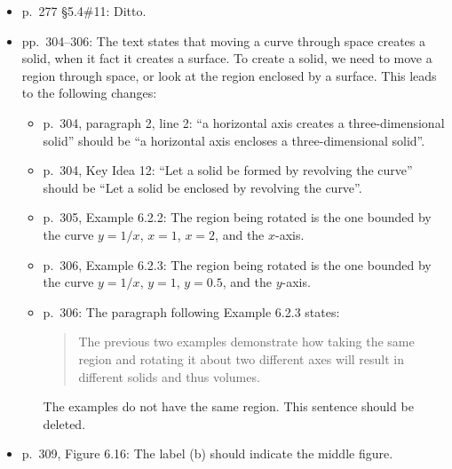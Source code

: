 \documentclass{amsart}
\begin{document}
\begin{itemize}
\item p.\ 277 \S5.4\#11: Ditto.
\item pp.\ 304--306: The text states that moving a curve through space creates a solid, when it fact it creates a surface.  To create a solid, we need to move a region through space, or look at the region enclosed by a surface.  This leads to the following changes:
\begin{itemize}
\item p.\ 304, paragraph 2, line 2: ``a horizontal axis creates a three-dimensional solid'' should be ``a horizontal axis encloses a three-dimensional solid''.
\item p.\ 304, Key Idea 12: ``Let a solid be formed by revolving the curve'' should be ``Let a solid be enclosed by revolving the curve''.
\item p.\ 305, Example 6.2.2: The region being rotated is the one bounded by the curve $y=1/x$, $x=1$, $x=2$, and the $x$-axis.
\item p.\ 306, Example 6.2.3: The region being rotated is the one bounded by the curve $y=1/x$, $y=1$, $y=0.5$, and the $y$-axis.
\item p.\ 306: The paragraph following Example 6.2.3 states:
\begin{quote}
The previous two examples demonstrate how taking the same region and rotating it about two different axes will result in different solids and thus volumes.
\end{quote}
The examples do not have the same region.  This sentence should be deleted.
\end{itemize}
\item p.\ 309, Figure 6.16: The label (b) should indicate the middle figure.
\end{itemize}
\end{document}
